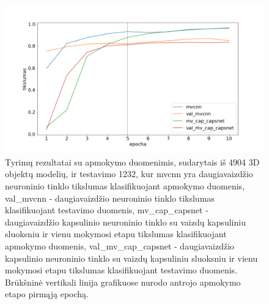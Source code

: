 \begin{figure}[H]
	\centering
	\includegraphics[scale=0.5]{img/less_data_v1.png}
	\caption{
		Tyrimų rezultatai su apmokymo duomenimis, sudarytais iš 4904 3D objektų modelių, ir testavimo 1232, kur mvcnn yra daugiavaizdžio neuroninio tinklo tikslumas klasifikuojant apmokymo duomenis, val\_mvcnn - daugiavaizdžio neuroninio tinklo tikslumas klasifikuojant testavimo duomenis, mv\_cap\_capsnet - daugiavaizdžio kapsulinio neuroninio tinklo su vaizdų kapsuliniu sluoksniu ir vienu mokymosi etapu tikslumas klasifikuojant apmokymo duomenis, val\_mv\_cap\_capsnet - daugiavaizdžio kapsulinio neuroninio tinklo su vaizdų kapsuliniu sluoksniu ir vienu mokymosi etapu tikslumas klasifikuojant testavimo duomenis. Brūkšninė vertikali linija grafikuose nurodo antrojo apmokymo etapo pirmąją epochą.
	}
	\label{img:less_datav1}
\end{figure}


